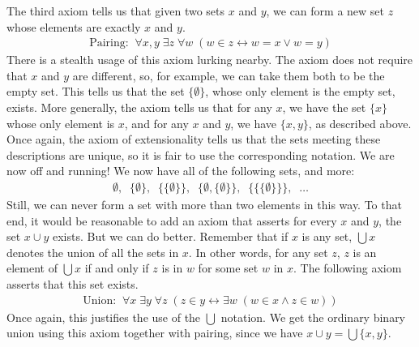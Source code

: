 \documentclass[letterpaper,10pt,english]{sphinxmanual}
\begin{document}
\sphinxAtStartPar
The third axiom tells us that given two sets \(x\) and \(y\), we can form a new set \(z\) whose elements are exactly \(x\) and \(y\).
\begin{equation*}
\begin{split}\text{Pairing:} \;\; \forall x, y \; \exists z \; \forall w \; (w \in z \leftrightarrow w = x \vee w = y)\end{split}
\end{equation*}
\sphinxAtStartPar
There is a stealth usage of this axiom lurking nearby. The axiom does not require that \(x\) and \(y\) are different, so, for example, we can take them both to be the empty set. This tells us that the set \(\{ \emptyset \}\), whose only element is the empty set, exists. More generally, the axiom tells us that for any \(x\), we have the set \(\{ x \}\) whose only element is \(x\), and for any \(x\) and \(y\), we have \(\{x, y\}\), as described above. Once again, the axiom of extensionality tells us that the sets meeting these descriptions are unique, so it is fair to use the corresponding notation. We are now off and running! We now have all of the following sets, and more:
\begin{equation*}
\begin{split}\emptyset, \;\; \{ \emptyset \}, \; \; \{ \{ \emptyset \} \}, \;\; \{ \emptyset, \{ \emptyset \} \}, \;\; \{ \{ \{ \emptyset \} \} \}, \;\; \ldots\end{split}
\end{equation*}
\sphinxAtStartPar
Still, we can never form a set with more than two elements in this way. To that end, it would be reasonable to add an axiom that asserts for every \(x\) and \(y\), the set \(x \cup y\) exists. But we can do better. Remember that if \(x\) is any set, \(\bigcup x\) denotes the union of all the sets in \(x\). In other words, for any set \(z\), \(z\) is an element of \(\bigcup x\) if and only if \(z\) is in \(w\) for some set \(w\) in \(x\). The following axiom asserts that this set exists.
\begin{equation*}
\begin{split}\text{Union:} \;\; \forall x \; \exists y \; \forall z \; (z \in y \leftrightarrow \exists w \; (w \in x \wedge z \in w))\end{split}
\end{equation*}
\sphinxAtStartPar
Once again, this justifies the use of the \(\bigcup\) notation. We get the ordinary binary union using this axiom together with pairing, since we have \(x \cup y = \bigcup \{ x, y \}\).
\end{document}
